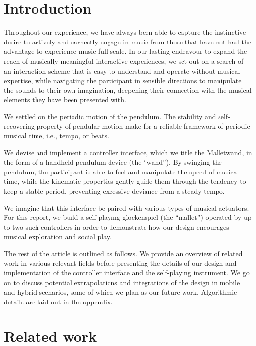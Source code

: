 \documentclass{nime-alternate} %
\begin{document}
\printccsdesc


\section{Introduction}

Throughout our experience, we have always been able to capture the instinctive desire to actively and earnestly engage in music from those that have not had the advantage to experience music full-scale.
In our lasting endeavour to expand the reach of musically-meaningful interactive experiences, we set out on a search of an interaction scheme that is easy to understand and operate without musical expertise, while navigating the participant in sensible directions to manipulate the sounds to their own imagination, deepening their connection with the musical elements they have been presented with.

We settled on the periodic motion of the pendulum. The stability and self-recovering property of pendular motion make for a reliable framework of periodic musical time, i.e., tempo, or beats.

We devise and implement a controller interface, which we title the Malletwand, in the form of a handheld pendulum device (the ``wand''). By swinging the pendulum, the participant is able to feel and manipulate the speed of musical time, while the kinematic properties gently guide them through the tendency to keep a stable period, preventing excessive deviance from a steady tempo.

We imagine that this interface be paired with various types of musical actuators. For this report, we build a self-playing glockenspiel (the ``mallet'') operated by up to two such controllers in order to demonstrate how our design encourages musical exploration and social play.

The rest of the article is outlined as follows. We provide an overview of related work in various relevant fields before presenting the details of our design and implementation of the controller interface and the self-playing instrument. We go on to discuss potential extrapolations and integrations of the design in mobile and hybrid scenarios, some of which we plan as our future work. Algorithmic details are laid out in the appendix.

\section{Related work}
\end{document}
